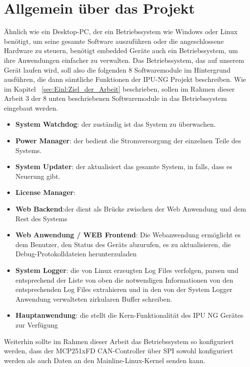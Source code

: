 \section{Allgemein über das Projekt}
\label{cha:ver:sec:Allgemein_über_das_Projekt}

Ähnlich wie ein Desktop-PC, der ein Betriebssystem wie Windows oder Linux benötigt, um seine gesamte Software auszuführen oder die angeschlossene Hardware zu steuern, benötigt embedded Geräte auch  ein Betriebssystem, um ihre Anwendungen einfacher zu verwalten. Das Betriebssystem, das auf unserem Gerät laufen wird, soll also die folgenden 8 Softwaremodule im Hintergrund ausführen, die dann sämtliche Funktionen der IPU-NG Projekt beschreiben. Wie im Kapitel ~\ref{sec:Einl:Ziel_der_Arbeit} beschrieben, sollen im Rahmen dieser Arbeit 3 der 8 unten beschriebenen Softwaremodule in das Betriebssystem eingebaut werden. 
 
\begin{itemize}
	\item \textbf{System Watchdog}: der zuständig ist das System zu überwachen.
	\item \textbf{Power Manager}: der bedient die Stromversorgung der einzelnen Teile des Systems.
	\item \textbf{System Updater}: der aktualisiert das gesamte System, in falls, dass es Neuerung gibt. 
	\item \textbf{License Manager}: 
	\item \textbf{Web Backend}:der dient als Brücke zwischen der Web Anwendung und dem Rest des Systems
	\item \textbf{Web Anwendung / WEB Frontend}: Die Webanwendung ermöglicht es dem Benutzer, den Status des Geräts abzurufen, es zu aktualisieren, die Debug-Protokolldateien
	herunterzuladen
	\item \textbf{System Logger}: die von Linux erzeugten Log Files verfolgen, parsen und entsprechend der
	Liste von oben die notwendigen Informationen von den entsprechenden Log Files extrahieren und in den von der
System Logger Anwendung verwalteten zirkularen Buffer schreiben. 
	\item \textbf{Hauptanwendung}: die stellt die Kern-Funktionalität des IPU NG Gerätes zur Verfügung
\end{itemize} 

Weiterhin sollte im Rahmen dieser Arbeit das Betriebssystem so konfiguriert werden, dass der MCP251xFD CAN-Controller über SPI  sowohl konfiguriert werden als auch Daten  an den Mainline-Linux-Kernel senden kann. 

